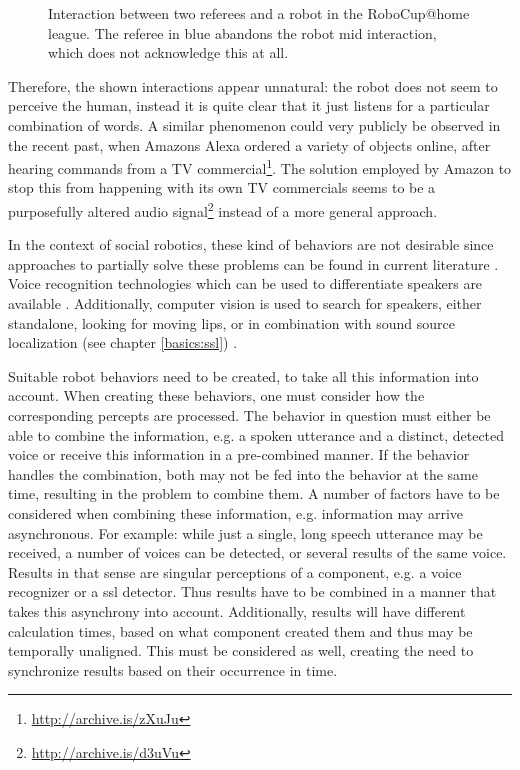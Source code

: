 \begin{figure}[]
	\caption{Interaction between two referees and a robot in the RoboCup@home league.
		The referee in blue abandons the robot mid interaction, which does not acknowledge this at all.}
	\label{pic:moti:imustgonow}
\end{figure}

Therefore, the shown interactions appear unnatural:
the robot does not seem to perceive the human, instead it is quite clear that it just listens for a particular combination of words.
A similar phenomenon could very publicly be observed in the recent past, when Amazons Alexa ordered a variety of objects online, after hearing commands from a  TV commercial\footnote{\url{http://archive.is/zXuJu}}.
The solution employed by Amazon to stop this from happening with its own TV commercials seems to be a purposefully altered audio signal\footnote{\url{http://archive.is/d3uVu}} instead of a more general approach.

In the context of social robotics, these kind of behaviors are not desirable since approaches to partially solve these problems can be found in current literature \cite{opdenAkker:2009:YAR:1708376.1708379}.
Voice recognition technologies which can be used to differentiate speakers are available \cite{DBLP:journals/corr/abs-1003-4083}.
Additionally, computer vision is used to search for speakers, either standalone, looking for moving lips, or in combination with sound source localization (see chapter \ref{basics:ssl}) \cite{1048137,lookwhostalking,840663,whosaidthat}.

Suitable robot behaviors need to be created, to take all this information into account.
When creating these behaviors, one must consider how the corresponding percepts are processed.
The behavior in question must either be able to combine the information, e.g. a spoken utterance and a distinct, detected voice or receive this information in a pre-combined manner.
If the behavior handles the combination, both may not be fed into the behavior at the same time, resulting in the problem to combine them.
A number of factors have to be considered when combining these information, e.g. information may arrive asynchronous.
For example:
while just a single, long speech utterance may be received, a number of voices can be detected, or several results of the same voice.
Results in that sense are singular perceptions of a component, e.g. a voice recognizer or a \gls{ssl} detector.
Thus results have to be combined in a manner that takes this asynchrony into account.
Additionally, results will have different calculation times, based on what component created them and thus may be temporally unaligned.
This must be considered as well, creating the need to synchronize results based on their occurrence in time.

